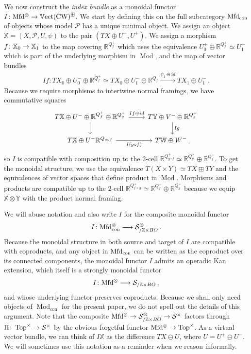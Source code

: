 \documentclass[10pt]{amsart}
\numberwithin{equation}{section}
\theoremstyle{definition}
\DeclareMathOperator{\Mod}{Mod}
\DeclareMathOperator{\con}{con}
\DeclareMathOperator{\Top}{Top}
\DeclareMathOperator{\bVect}{\mathbb{V}ect}
\DeclareMathOperator{\CW}{CW}
\newcommand{\Mfd}{\mathrm{Mfd}\vphantom{d}}
\newcommand{\bZ}{\mathbb{Z}}
\newcommand{\bR}{\mathbb{R}}
\newcommand{\bX}{\mathbb{X}}
\newcommand{\bY}{\mathbb{Y}}
\newcommand{\bW}{\mathbb{W}}
\newcommand{\cP}{\mathcal{P}}
\newcommand{\cS}{\mathcal{S}}
\renewcommand{\to}{\mathchoice{\longrightarrow}{\rightarrow}{}{}}
\begin{document}
We now construct the \emph{index bundle} as a monoidal functor $I\colon \Mfd^{\otimes} \to \bVect(\CW)^{\boxplus}$.
We start by defining this on the full subcategory $\Mfd_{\con}$ of objects whose model $\cP$ has a unique minimal object.
We assign an object $\bX = (X,\cP,U,\psi)$ to the pair $(TX \oplus U^{-}, U^{+})$.
We assign a morphism $f\colon \bX_{0} \to \bX_{1}$ to the map covering $\bR^{Q_{f}^{+}}$ which uses the equivalence $U_{0}^{+}\oplus \bR^{Q_{f}^{+}} \simeq U_{1}^{+}$ which is part of the underlying morphism in $\Mod$, and the map of vector bundles
\begin{align*}
	If\colon TX_{0} \oplus U_{0}^{-} \oplus \bR^{Q_{f}^{+}} \simeq TX_{0} \oplus U_{1}^{-} \oplus \bR^{Q_{f}} \xrightarrow{\psi_{1} \oplus id} TX_{1} \oplus U_{1}^{-} \,.
\end{align*}
Because we require morphisms to intertwine normal framings, we have commutative squares
\begin{equation*}
	\begin{tikzcd}
		T\bX \oplus U^{-} \oplus  \bR^{Q_{f}^{+}} \oplus \bR^{Q_{g}^{+}} \arrow[r, "If \oplus id"] \arrow[d]      &   T\bY \oplus V^{-} \oplus \bR^{Q_{g}^{+}}  \arrow[d, "Ig"] \\
		T\bX \oplus U^{-} \bR^{Q_{g\circ f}}  \arrow[r, "I(g\circ f)"']               &   T\bW \oplus W^{-} \, ,
	\end{tikzcd}
\end{equation*}
so $I$ is compatible with composition up to the 2-cell $\bR^{Q_{g\circ f}^{+}} \simeq \bR^{Q_{g}^{+}} \oplus \bR^{Q_{f}^{+}}$. To get the monoidal structure, we use the equivalence $T(X\times Y) \simeq TX\boxplus TY$ and the equivalences of vector spaces that define product in $\Mod$.
Morphisms and products are compatible up to the 2-cell $\bR^{Q_{f\times g}^{+}} \simeq \bR^{Q_{f}^{+}} \oplus \bR^{Q_{g}^{+}}$ because we equip $\bX\otimes \bY$ with the product normal framing.


We will abuse notation and also write $I$ for the composite monoidal functor
\begin{equation*}
    I \colon \Mfd^{\otimes}_{\con} \to \cS_{/\bZ\times BO}^{\otimes} \,.
\end{equation*}
Because the monoidal structure in both source and target of $I$ are compatible with coproducts, and any object in $\Mfd_{\con}$ can be written as the coproduct over its connected components, the monoidal functor $I$ admits an operadic Kan extension, which itself is a strongly monoidal functor
\begin{align*}
	I\colon \Mfd^{\otimes} \to \cS_{/\bZ\times BO} \, ,
\end{align*}
and whose underlying functor preserves coproducts.
Because we shall only need objects of $\Mod_{\con}$ for the present paper, we do not spell out the details of this argument.
Note that the composite $\Mfd^{\otimes} \to \cS_{/\bZ\times BO}^{\otimes} \to \cS^{\times}$ factors through $\Pi\colon \Top^{\times} \to \cS^{\times}$ by the obvious forgetful functor $\Mfd^{\otimes} \to \Top^{\times}$.
As a virtual vector bundle, we can think of $I\bX$ as the difference $TX \ominus U$, where $U= U^{+}\ominus U^{-}$. We will sometimes use this notation as a reminder when we reason informally.
\end{document}
